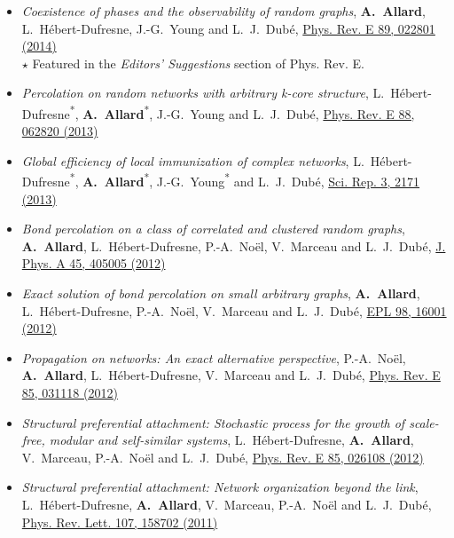 \documentclass[11pt]{article}
\begin{document}
\begin{itemize}[itemsep=0.5em]
%
  \item \textit{Coexistence of phases and the observability of random graphs}, \textbf{A.~Allard}, L.~H\'ebert-Dufresne, J.-G.~Young and L.~J.~Dub\'e, \href{http://dx.doi.org/10.1103/PhysRevE.89.022801}{Phys. Rev. E 89, 022801 (2014)}\\
  {\footnotesize $\star$ Featured in the \textit{Editors' Suggestions} section of Phys. Rev. E.}
%
  \item\textit{Percolation on random networks with arbitrary k-core structure}, L.~H\'ebert-Dufresne\textsuperscript{*}, \textbf{A.~Allard}\textsuperscript{*}, J.-G.~Young and L.~J.~Dub\'e, \href{http://dx.doi.org/10.1103/PhysRevE.88.062820}{Phys. Rev. E 88, 062820 (2013)}
%
  \item \textit{Global efficiency of local immunization of complex networks}, L.~H\'ebert-Dufresne\textsuperscript{*}, \textbf{A.~Allard}\textsuperscript{*}, J.-G.~Young\textsuperscript{*} and L.~J.~Dub\'e, \href{http://dx.doi.org/10.1038/srep02171}{Sci. Rep. 3, 2171 (2013)}
%
  \item \textit{Bond percolation on a class of correlated and clustered random graphs}, \textbf{A.~Allard}, L.~H\'ebert-Dufresne, P.-A.~No\"el, V.~Marceau and L.~J.~Dub\'e, \href{http://dx.doi.org/10.1088/1751-8113/45/40/405005}{J. Phys. A 45, 405005 (2012)}
%
  \item \textit{Exact solution of bond percolation on small arbitrary graphs}, \textbf{A.~Allard}, L.~H\'ebert-Dufresne, P.-A.~No\"el, V.~Marceau and L.~J.~Dub\'e, \href{http://dx.doi.org/10.1209/0295-5075/98/16001}{EPL 98, 16001 (2012)}
%
  \item \textit{Propagation on networks: An exact alternative perspective}, P.-A.~No\"el, \textbf{A.~Allard}, L.~H\'ebert-Dufresne, V.~Marceau and L.~J.~Dub\'e, \href{http://dx.doi.org/10.1103/PhysRevE.85.031118}{Phys. Rev. E 85, 031118 (2012)}
%
  \item \textit{Structural preferential attachment: Stochastic process for the growth of scale-free, modular and self-similar systems}, L.~H\'ebert-Dufresne, \textbf{A.~Allard}, V.~Marceau, P.-A.~No\"el and L.~J.~Dub\'e, \href{http://dx.doi.org/10.1103/PhysRevE.85.026108}{Phys. Rev. E 85, 026108 (2012)}
%
  \item \textit{Structural preferential attachment: Network organization beyond the link}, L.~H\'ebert-Dufresne, \textbf{A.~Allard}, V.~Marceau, P.-A.~No\"el and L.~J.~Dub\'e, \href{http://dx.doi.org/10.1103/PhysRevLett.107.158702}{Phys. Rev. Lett. 107, 158702 (2011)}

\end{itemize}
\end{document}
